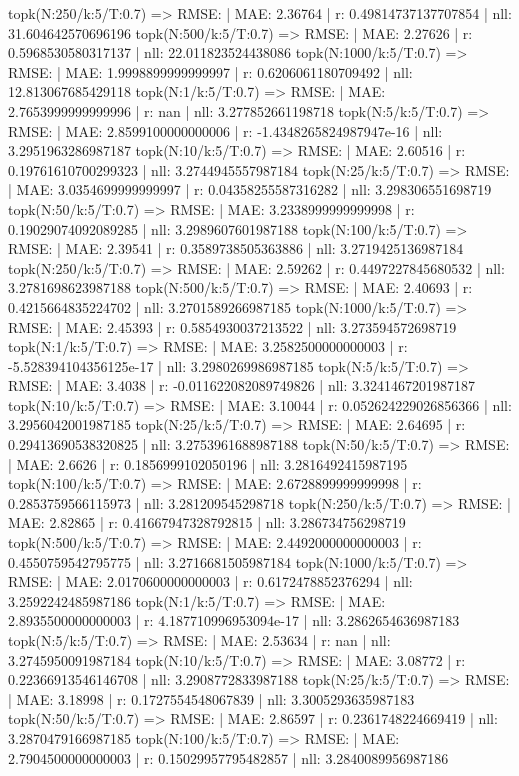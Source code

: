 topk(N:250/k:5/T:0.7) => RMSE: | MAE: 2.36764 | r: 0.49814737137707854 | nll: 31.604642570696196
topk(N:500/k:5/T:0.7) => RMSE: | MAE: 2.27626 | r: 0.5968530580317137 | nll: 22.011823524438086
topk(N:1000/k:5/T:0.7) => RMSE: | MAE: 1.9998899999999997 | r: 0.6206061180709492 | nll: 12.813067685429118
topk(N:1/k:5/T:0.7) => RMSE: | MAE: 2.7653999999999996 | r: nan | nll: 3.277852661198718
topk(N:5/k:5/T:0.7) => RMSE: | MAE: 2.8599100000000006 | r: -1.4348265824987947e-16 | nll: 3.2951963286987187
topk(N:10/k:5/T:0.7) => RMSE: | MAE: 2.60516 | r: 0.19761610700299323 | nll: 3.2744945557987184
topk(N:25/k:5/T:0.7) => RMSE: | MAE: 3.0354699999999997 | r: 0.04358255587316282 | nll: 3.298306551698719
topk(N:50/k:5/T:0.7) => RMSE: | MAE: 3.2338999999999998 | r: 0.19029074092089285 | nll: 3.2989607601987188
topk(N:100/k:5/T:0.7) => RMSE: | MAE: 2.39541 | r: 0.3589738505363886 | nll: 3.2719425136987184
topk(N:250/k:5/T:0.7) => RMSE: | MAE: 2.59262 | r: 0.4497227845680532 | nll: 3.2781698623987188
topk(N:500/k:5/T:0.7) => RMSE: | MAE: 2.40693 | r: 0.4215664835224702 | nll: 3.2701589266987185
topk(N:1000/k:5/T:0.7) => RMSE: | MAE: 2.45393 | r: 0.5854930037213522 | nll: 3.273594572698719
topk(N:1/k:5/T:0.7) => RMSE: | MAE: 3.2582500000000003 | r: -5.528394104356125e-17 | nll: 3.2980269986987185
topk(N:5/k:5/T:0.7) => RMSE: | MAE: 3.4038 | r: -0.011622082089749826 | nll: 3.3241467201987187
topk(N:10/k:5/T:0.7) => RMSE: | MAE: 3.10044 | r: 0.052624229026856366 | nll: 3.2956042001987185
topk(N:25/k:5/T:0.7) => RMSE: | MAE: 2.64695 | r: 0.29413690538320825 | nll: 3.2753961688987188
topk(N:50/k:5/T:0.7) => RMSE: | MAE: 2.6626 | r: 0.1856999102050196 | nll: 3.2816492415987195
topk(N:100/k:5/T:0.7) => RMSE: | MAE: 2.6728899999999998 | r: 0.2853759566115973 | nll: 3.281209545298718
topk(N:250/k:5/T:0.7) => RMSE: | MAE: 2.82865 | r: 0.41667947328792815 | nll: 3.286734756298719
topk(N:500/k:5/T:0.7) => RMSE: | MAE: 2.4492000000000003 | r: 0.4550759542795775 | nll: 3.2716681505987184
topk(N:1000/k:5/T:0.7) => RMSE: | MAE: 2.0170600000000003 | r: 0.6172478852376294 | nll: 3.2592242485987186
topk(N:1/k:5/T:0.7) => RMSE: | MAE: 2.8935500000000003 | r: 4.187710996953094e-17 | nll: 3.2862654636987183
topk(N:5/k:5/T:0.7) => RMSE: | MAE: 2.53634 | r: nan | nll: 3.2745950091987184
topk(N:10/k:5/T:0.7) => RMSE: | MAE: 3.08772 | r: 0.22366913546146708 | nll: 3.2908772833987188
topk(N:25/k:5/T:0.7) => RMSE: | MAE: 3.18998 | r: 0.1727554548067839 | nll: 3.3005293635987183
topk(N:50/k:5/T:0.7) => RMSE: | MAE: 2.86597 | r: 0.2361748224669419 | nll: 3.2870479166987185
topk(N:100/k:5/T:0.7) => RMSE: | MAE: 2.7904500000000003 | r: 0.15029957795482857 | nll: 3.2840089956987186
